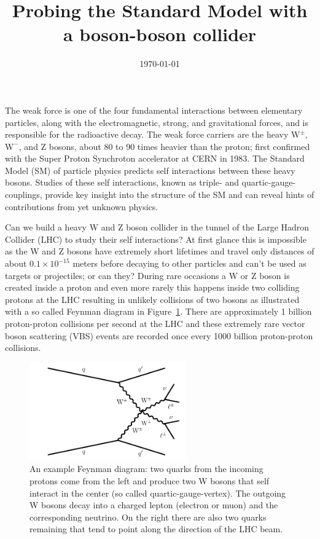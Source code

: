 \documentclass[12pt]{article}
\begin{document}
\title{Probing the Standard Model with a boson-boson collider}
\date{\today}
\maketitle

The weak force is one of the four fundamental interactions between elementary particles, along with the electromagnetic, strong, and gravitational forces, and is responsible for the radioactive decay. The weak force carriers are the heavy $\mathrm{W}^{\pm}$, $\mathrm{W}^{-}$, and Z bosons, about 80 to 90 times heavier than the proton; first confirmed with the Super Proton Synchroton accelerator at CERN in 1983. The Standard Model (SM) of particle physics predicts self interactions between these heavy bosons. Studies of these self interactions, known as triple- and quartic-gauge-couplings, provide key insight into the structure of the SM and can reveal hints of contributions from yet unknown physics. 

Can we build a heavy W and Z boson collider in the tunnel of the Large Hadron Collider (LHC) to study their self interactions? At first glance this is impossible as the W and Z bosons have extremely short lifetimes and travel only distances of about $0.1 \times 10^{-15}$ meters before decaying to other particles and can't be used as targets or projectiles; or can they? During rare occasions a W or Z boson is created inside a proton and even more rarely this happens inside two colliding protons at the LHC resulting in unlikely collisions of two bosons as illustrated with a so called Feynman diagram in Figure~\ref{fig:feynman}. There are approximately 1 billion proton-proton collisions per second at the LHC and these extremely rare vector boson scattering (VBS) events are recorded once every 1000 billion proton-proton collisions.

\begin{figure}[htb]
\centering
\includegraphics[width=0.60\textwidth]{figures/leptonic_vbs_quartic.pdf}
\caption{An example Feynman diagram: two quarks from the incoming protons come from the left and produce two W bosons that self interact in the center (so called quartic-gauge-vertex). The outgoing W bosons decay into a charged lepton (electron or muon) and the corresponding neutrino. On the right there are also two quarks remaining that tend to point along the direction of the LHC beam.}
\label{fig:feynman}
\end{figure}
\end{document}
